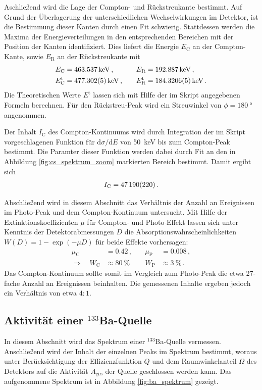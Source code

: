 Aschließend wird die Lage der Compton- und Rückstreukante bestimmt.
Auf Grund der Überlagerung der unterschiedlichen Wechselwirkungen im Detektor, ist die Bestimmung dieser Kanten durch einen Fit schwierig.
Stattdessen werden die Maxima der Energieverteilungen in den entsprechenden Bereichen mit der Position der Kanten identifiziert.
Dies liefert die Energie $E_\text{C}$ an der Compton-Kante, sowie $E_\text{R}$ an der Rückstreukante mit
\begin{align*}
    E_\text{C} &= \SI{463.537}{keV}\,, &\quad E_\text{R} &= \SI{192.887}{keV} \,,\\
    E_\text{C}^\text{t} &= \SI{477.302+-0.005}{keV}\,, &\quad E_\text{R}^\text{t} &= \SI{184.3206+-0.0005}{keV} \,.\\
\end{align*}
Die Theoretischen Werte $E^\text{t}$ lassen sich mit Hilfe der im Skript angegebenen Formeln berechnen. Für den Rückstreu-Peak wird ein Streuwinkel von $\phi = \SI{180}{\degree}$ angenommen.

Der Inhalt $I_\text{C}$ des Compton-Kontinuums wird durch Integration der im Skript vorgeschlagenen Funktion für $\text{d}\sigma/\text{d}E$ von \SI{50}{keV} bis zum Compton-Peak bestimmt.
Die Paramter dieser Funktion werden dabei durch Fit an den in Abbildung \ref{fig:cs_spektrum_zoom} markierten Bereich bestimmt. Damit ergibt sich
\begin{align*}
    I_\text{C} = \num{47190+-220}\,.
\end{align*}

Abschließend wird in diesem Abschnitt das Verhältnis der Anzahl an Ereignissen im Photo-Peak und dem Compton-Kontinuum untersucht.
Mit Hilfe der Extinktionskoeffizienten $\mu$ für Compton- und Photo-Effekt lassen sich unter Kenntnis der Detektorabmessungen $D$ die Absorptionswahrscheinlichkeiten $W(D)=1-\exp(-\mu D)$ für beide Effekte vorhersagen:
\begin{align*}
    \mu_\text{C} &= \num{0.42}\,, &\quad \mu_\text{P} &= \num{0.008}\,,\\
    \Rightarrow \quad W_\text{C} &\approx \SI{80}{\percent} &\quad W_\text{P} &\approx \SI{3}{\percent} \,.
\end{align*}
Das Compton-Kontinuum sollte somit im Vergleich zum Photo-Peak die etwa \num{27}-fache Anzahl an Ereignissen beinhalten.
Die gemessenen Inhalte ergeben jedoch ein Verhältnis von etwa $4:1$.

\subsection{Aktivität einer $^{133}$Ba-Quelle} %
\label{sub:ba_quelle}
In diesem Abschnitt wird das Spektrum einer $^{133}$Ba-Quelle vermessen. Anschließend wird der Inhalt der einzelnen Peaks im Spektrum bestimmt, woraus unter Berücksichtigung der Effizienzfunktion $Q$ und dem Raumwinkelanteil $\Omega$ des Detektors auf die Aktivität $A_\text{ges}$ der Quelle geschlossen werden kann.
Das aufgenommene Spektrum ist in Abbildung \ref{fig:ba_spektrum} gezeigt.

